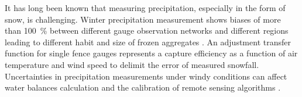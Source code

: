 
\par\medskip
\noindent
It has long been known that measuring precipitation, especially in the form of snow, is challenging. Winter precipitation measurement shows biases of more than \SI{100}{\percent} between different gauge observation networks and different regions leading to different habit and size of frozen aggregates \citep{kochendorfer_analysis_2017}. An adjustment transfer function for single fence gauges represents a capture efficiency as a function of air temperature and wind speed to delimit the error of measured snowfall.
Uncertainties in precipitation measurements under windy conditions can affect water balances calculation and the calibration of remote sensing algorithms \citep{wolff_derivation_2015}. 
\par\medskip
\noindent
